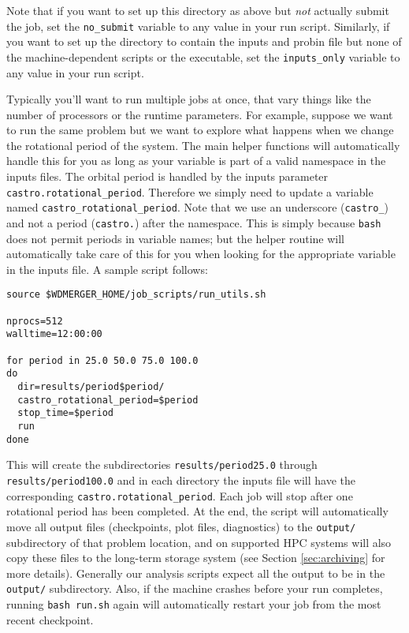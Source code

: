 \documentclass[12pt]{book}
\begin{document}
Note that if you want to set up this directory as above but \textit{not} actually submit the job, 
set the \texttt{no\_submit} variable to any value in your run script. Similarly, if you want to 
set up the directory to contain the inputs and probin file but none of the machine-dependent 
scripts or the executable, set the \texttt{inputs\_only} variable to any value in your run script.

Typically you'll want to run multiple jobs at once, that vary things like the number of processors 
or the runtime parameters. For example, suppose we want to run the same problem but we want to 
explore what happens when we change the rotational period of the system. The main helper functions 
will automatically handle this for you as long as your variable is part of a valid namespace in the inputs files.
The orbital period is handled by the inputs parameter \texttt{castro.rotational\_period}. Therefore 
we simply need to update a variable named \texttt{castro\_rotational\_period}. 
Note that we use an underscore (\texttt{castro\_}) and not a period (\texttt{castro.}) after the namespace.
This is simply because \texttt{bash} does not permit periods in variable names; but the helper routine will 
automatically take care of this for you when looking for the appropriate variable in the inputs file.
A sample script follows:

\begin{lstlisting}
source $WDMERGER_HOME/job_scripts/run_utils.sh

nprocs=512
walltime=12:00:00

for period in 25.0 50.0 75.0 100.0
do
  dir=results/period$period/
  castro_rotational_period=$period
  stop_time=$period
  run
done
\end{lstlisting}%
This will create the subdirectories \texttt{results/period25.0} through \texttt{results/period100.0}
and in each directory the inputs file will have the corresponding \texttt{castro.rotational\_period}.
Each job will stop after one rotational period has been completed. At the end, the script will automatically move all 
output files (checkpoints, plot files, diagnostics)
to the \texttt{output/} subdirectory of that problem location, and on supported HPC systems will also copy these 
files to the long-term storage system (see Section \ref{sec:archiving} for more details). 
Generally our analysis scripts expect all the output to be in the 
\texttt{output/} subdirectory. Also, if the machine crashes before your run completes, running \texttt{bash run.sh}
again will automatically restart your job from the most recent checkpoint.
\end{document}
